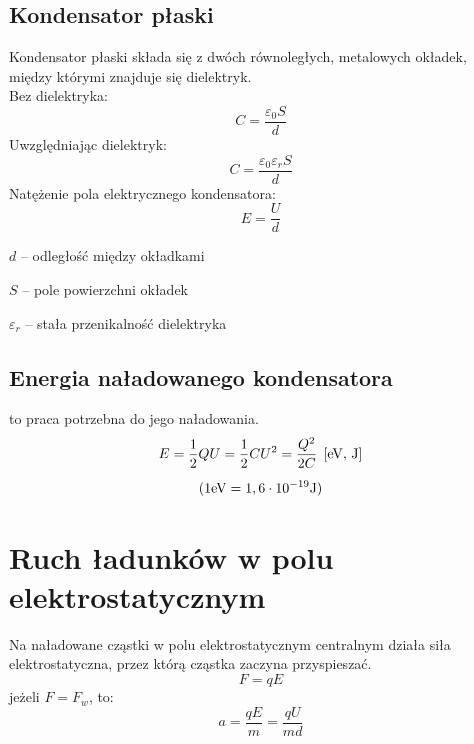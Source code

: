 \subsection{Kondensator płaski}
\begin{definition}
  Kondensator płaski składa się z dwóch równoległych, metalowych okładek, między którymi znajduje
  się dielektryk.\\[1.5em]
  Bez dielektryka:
  \begin{equation*}
    C = \frac{\varepsilon_0 S}{d}
  \end{equation*}
  Uwzględniając dielektryk:
  \begin{equation*}
    C = \frac{\varepsilon_0 \varepsilon_r S}{d}
  \end{equation*}
  Natężenie pola elektrycznego kondensatora:
  \begin{equation*}
    E = \frac Ud
  \end{equation*}
  \begin{symbols}
    \item $d$ -- odległość między okładkami
    \item $S$ -- pole powierzchni okładek
    \item $\varepsilon_r$ -- stała przenikalność dielektryka
  \end{symbols}
\end{definition}

\subsection{Energia naładowanego kondensatora}
\begin{definition}
   to praca potrzebna do jego naładowania.
  \begin{gather*}
    E = \frac 12 QU = \frac 12 CU^2 = \frac{Q^2}{2C} \;\left[\mathrm{eV},\,\mathrm{J}\right]\\[0.5em]
    (1\mathrm{eV} = 1,6\cdot 10^{-19} \mathrm{J})
  \end{gather*}
\end{definition}

\section{Ruch ładunków w polu elektrostatycznym}
Na naładowane cząstki w polu elektrostatycznym centralnym działa siła elektrostatyczna, przez którą
cząstka zaczyna przyspieszać.
\begin{equation*}
  F = qE
\end{equation*}
jeżeli $F = F_w$, to:
\begin{equation*}
  a = \frac{qE}{m} = \frac{qU}{md}
\end{equation*}
